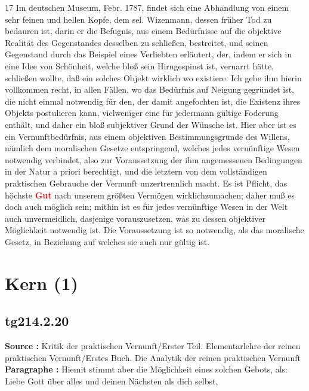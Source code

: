 \documentclass[a4paper,12pt,twoside]{book}
\newcommand{\match}[1]{\textcolor{red}{\textbf{#1}}}
\newcommand{\unnumberedsection}[1]{
	\section*{#1}
	\addcontentsline{toc}{section}{#1}
	\markright{#1}
}
\begin{document}
	17 Im deutschen Museum, Febr. 1787, findet sich eine Abhandlung von einem sehr feinen und hellen Kopfe, dem sel. Wizenmann, dessen früher Tod zu bedauren ist, darin er die Befugnis, aus einem Bedürfnisse auf die objektive Realität des Gegenstandes desselben zu schließen, bestreitet, und seinen Gegenstand durch das Beispiel eines Verliebten erläutert, der, indem er sich in eine Idee von Schönheit, welche bloß sein Hirngespinst ist, vernarrt hätte, schließen wollte, daß ein solches Objekt wirklich wo existiere. Ich gebe ihm hierin vollkommen recht, in allen Fällen, wo das Bedürfnis auf Neigung gegründet ist, die nicht einmal notwendig für den, der damit angefochten ist, die Existenz ihres Objekts postulieren kann, vielweniger eine für jedermann gültige Foderung enthält, und daher ein bloß subjektiver Grund der Wünsche ist. Hier aber ist es ein Vernunftbedürfnis, aus einem objektiven Bestimmungsgrunde des Willens, nämlich dem moralischen Gesetze entspringend, welches jedes vernünftige Wesen notwendig verbindet, also zur Voraussetzung der ihm angemessenen Bedingungen in der Natur a priori berechtigt, und die letztern von dem vollständigen praktischen Gebrauche der Vernunft unzertrennlich macht. Es ist Pflicht, das höchste \match{Gut} nach unserem größten Vermögen wirklichzumachen; daher muß es doch auch möglich sein; mithin ist es für jedes vernünftige Wesen in der Welt auch unvermeidlich, dasjenige vorauszusetzen, was zu dessen objektiver Möglichkeit notwendig ist. Die Voraussetzung ist so notwendig, als das moralische Gesetz, in Beziehung auf welches sie auch nur gültig ist. 
	
	\unnumberedsection{Kern (1)} 
	\subsection*{tg214.2.20} 
	\textbf{Source : }Kritik der praktischen Vernunft/Erster Teil. Elementarlehre der reinen praktischen Vernunft/Erstes Buch. Die Analytik der reinen praktischen Vernunft\\  
	
	\textbf{Paragraphe : }Hiemit stimmt aber die Möglichkeit eines solchen Gebots, als: Liebe Gott über alles und deinen Nächsten als dich selbst,
	
\end{document}
